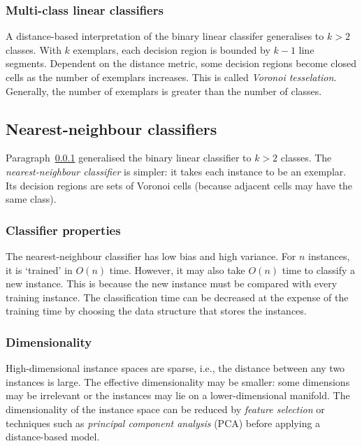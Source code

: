 \subsubsection{Multi-class linear classifiers}
\label{par:8:multi-class-linear-classifiers}

A distance-based interpretation of the binary linear classifer generalises to
$k > 2$ classes.
With $k$ exemplars, each decision region is bounded by $k - 1$ line segments.
Dependent on the distance metric, some decision regions become closed cells as
the number of exemplars increases.
This is called \textit{Voronoi tesselation}.
Generally, the number of exemplars is greater than the number of classes.

\subsection{Nearest-neighbour classifiers}

Paragraph~\ref{par:8:multi-class-linear-classifiers} generalised the binary
linear classifier to $k > 2$ classes.
The \textit{nearest-neighbour classifier} is simpler: it takes each instance to
be an exemplar.
Its decision regions are sets of Voronoi cells (because adjacent cells may have
the same class).

\subsubsection{Classifier properties}

The nearest-neighbour classifier has low bias and high variance.
For $n$ instances, it is `trained' in $O(n)$ time.
However, it may also take $O(n)$ time to classify a new instance.
This is because the new instance must be compared with every training instance.
The classification time can be decreased at the expense of the training time by
choosing the data structure that stores the instances.

\subsubsection{Dimensionality}

High-dimensional instance spaces are sparse, i.e., the distance between any two
instances is large.
The effective dimensionality may be smaller: some dimensions may be irrelevant
or the instances may lie on a lower-dimensional manifold.
The dimensionality of the instance space can be reduced by \textit{feature selection}
or techniques such as \textit{principal component analysis} (PCA) before
applying a distance-based model.

